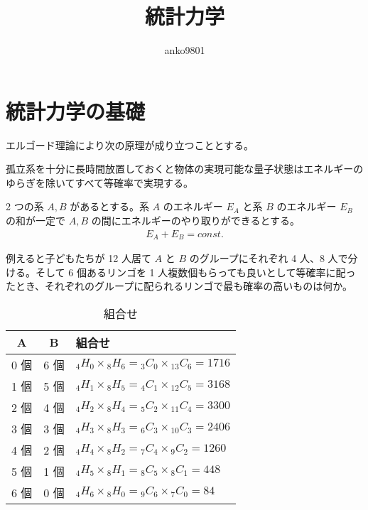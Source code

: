 \documentclass[uplatex,diffipdfmx,a4paper,11pt]{jlreq}
\title{統計力学}
\author{anko9801}
\numberwithin{equation}{section}
\theoremstyle{definition}
\begin{document}
\maketitle
\tableofcontents
\clearpage

\section{統計力学の基礎}
エルゴード理論により次の原理が成り立つこととする。
\begin{axiom}[等確率の原理]
  孤立系を十分に長時間放置しておくと物体の実現可能な量子状態はエネルギーのゆらぎを除いてすべて等確率で実現する。
\end{axiom}

2 つの系 $A, B$ があるとする。系 $A$ のエネルギー $E_A$ と系 $B$ のエネルギー $E_B$ の和が一定で $A, B$ の間にエネルギーのやり取りができるとする。
\begin{align}
  E_A + E_B = const.
\end{align}

例えると子どもたちが 12 人居て $A$ と $B$ のグループにそれぞれ 4 人、8 人で分ける。そして 6 個あるリンゴを 1 人複数個もらっても良いとして等確率に配ったとき、それぞれのグループに配られるリンゴで最も確率の高いものは何か。
\begin{table}[hbtp]
  \label{table:micro}
  \centering
  \begin{tabular}{|c|c|l|}
    \hline
    A   & B   & 組合せ                                                         \\
    \hline
    0 個 & 6 個 & ${}_4H_0\times {}_{8}H_6 = {}_3C_0\times {}_{13}C_6 = 1716$ \\
    1 個 & 5 個 & ${}_4H_1\times {}_{8}H_5 = {}_4C_1\times {}_{12}C_5 = 3168$ \\
    2 個 & 4 個 & ${}_4H_2\times {}_{8}H_4 = {}_5C_2\times {}_{11}C_4 = 3300$ \\
    3 個 & 3 個 & ${}_4H_3\times {}_{8}H_3 = {}_6C_3\times {}_{10}C_3 = 2406$ \\
    4 個 & 2 個 & ${}_4H_4\times {}_{8}H_2 = {}_7C_4\times {}_{9}C_2 = 1260$  \\
    5 個 & 1 個 & ${}_4H_5\times {}_{8}H_1 = {}_8C_5\times {}_{8}C_1 = 448$   \\
    6 個 & 0 個 & ${}_4H_6\times {}_{8}H_0 = {}_9C_6\times {}_{7}C_0 = 84$    \\
    \hline
  \end{tabular}
  \caption{組合せ}
\end{table}
\end{document}
